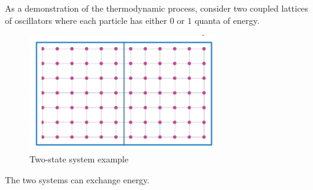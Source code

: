 \documentclass[12pt, a4paper]{article}
\newcounter{exa}
\begin{document}
As a demonstration of the thermodynamic process, consider two coupled lattices of oscillators where each particle has either $0$ or $1$ quanta of energy.

\begin{figure}[H]
\centering
\includegraphics[width=80mm]{6.png}
\caption{Two-state system example}
\end{figure}

The two systems can exchange energy.
\end{document}
